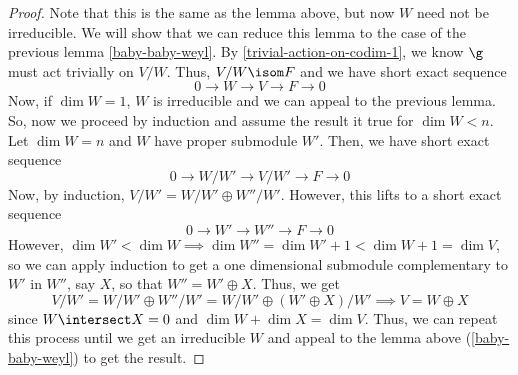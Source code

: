 \documentclass[11pt,leqno,oneside]{amsart}
\numberwithin{thm}{section}
\begin{document}
\begin{proof}
  Note that this is the same as the lemma above, but now \(W\) need
  not be irreducible. We will show that we can reduce this lemma to
  the case of the previous lemma \ref{baby-baby-weyl}. By
  \ref{trivial-action-on-codim-1}, 
  we know \(\g\) must act trivially on \(V/W\). Thus, \(V/W \isom F\)
  and we have short exact sequence \[
    0 \to W \to V \to F \to 0
  \]
  Now, if \(\dim W = 1\), \(W\) is irreducible and we can appeal to
  the previous lemma. So, now we proceed by induction and assume the
  result it true for \(\dim W < n\). Let \(\dim W = n\) and \(W\) have
  proper submodule \(W'\). Then, we have short exact sequence \[
    0 \to W/W' \to V/W' \to F \to 0
  \]
  Now, by induction, \(V/W' = W/W' \oplus W''/W'\). However, this
  lifts to a short exact sequence \[
    0 \to W' \to W'' \to F \to 0 
  \]
  However, \(\dim W' < \dim W \implies \dim W'' = \dim W' + 1 < \dim W
  + 1 = \dim V\), so we can apply induction to get a one dimensional
  submodule complementary to \(W'\) in \(W''\), say \(X\), so that
  \(W'' = W' \oplus X\). Thus, we get \[
    V/W' = W/W' \oplus W''/W' = W/W' \oplus (W' \oplus X)/W' \implies
    V = W \oplus X
  \]
  since \(W \intersect X = 0\) and \(\dim W + \dim X = \dim V\). Thus,
  we can repeat this process until we get an irreducible \(W\) and
  appeal to the lemma above (\ref{baby-baby-weyl}) to get the result.
\end{proof}
\end{document}
